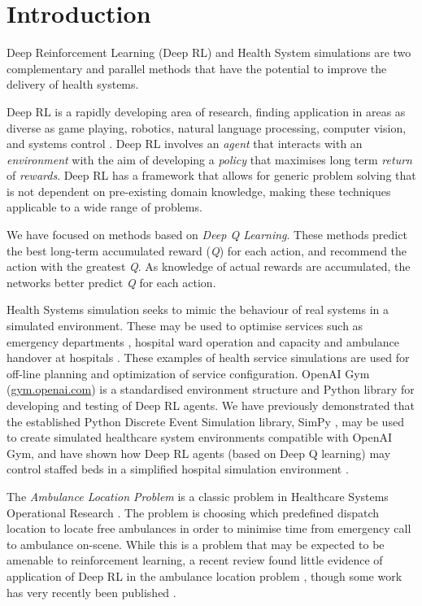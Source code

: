 \documentclass{article}
\begin{document}
\section{Introduction}

Deep Reinforcement Learning (Deep RL) and Health System simulations are two complementary and parallel methods that have the potential to improve the delivery of health systems.

Deep RL is a rapidly developing area of research, finding application in areas as diverse as game playing, robotics, natural language processing, computer vision, and systems control \cite{li_deep_2018}. Deep RL involves an \emph{agent} that interacts with an \emph{environment} with the aim of developing a \emph{policy} that maximises long term \emph{return} of \emph{rewards}. Deep RL has a framework that allows for generic problem solving that is not dependent on pre-existing domain knowledge, making these techniques applicable to a wide range of problems.

We have focused on methods based on \emph{Deep Q Learning}. These methods predict the best long-term accumulated reward (\emph{Q}) for each action, and recommend the action with the greatest \emph{Q}. As knowledge of actual rewards are accumulated, the networks better predict \emph{Q} for each action. 

Health Systems simulation seeks to mimic the behaviour of real systems in a simulated environment. These may be used to optimise services such as emergency departments \cite{monks_using_2017}, hospital ward operation and capacity \cite{penn_towards_2020} and ambulance handover at hospitals \cite{clarey_ambulance_2014}. These examples of health service simulations are used for off-line planning and optimization of service configuration. 
OpenAI Gym (\url{gym.openai.com}) is a standardised environment structure and Python library for developing and testing of Deep RL agents. We have previously demonstrated that the established Python Discrete Event Simulation library,  SimPy \cite{team_simpy_simpy_2020}, may be used to create simulated healthcare system environments compatible with OpenAI Gym, and have shown how Deep RL agents (based on Deep Q learning) may control staffed beds in a simplified hospital simulation environment \cite{allen_integrating_2020}.

The \emph{Ambulance Location Problem} is a classic problem in Healthcare Systems Operational Research \cite{brotcorne_ambulance_2003}. The problem is choosing which predefined dispatch location to locate free ambulances in order to minimise time from emergency call to ambulance on-scene. While this is a problem that may be expected to be amenable to reinforcement learning, a recent review found little evidence of application of Deep RL in the ambulance location problem \cite{tassone_comprehensive_2020}, though some work has very recently been published \cite{ji_deep_2019, liu_ambulance_2020}.
\end{document}
